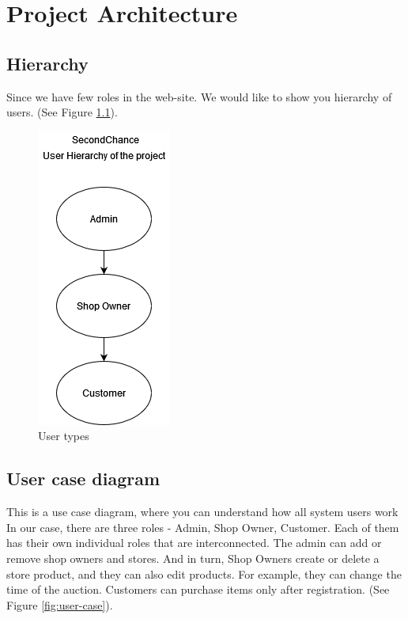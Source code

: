 \chapter{Project Architecture}\label{ch:B}

\section{Hierarchy}
Since we have few roles in the web-site. We would like to show you hierarchy of users. (See Figure \ref{fig:Hierarchy}).

\begin{figure}[h!]
    \centering
    \includegraphics[scale=0.9]{figures/Hierarchy.png}
    \caption{User types}
    \label{fig:Hierarchy}
\end{figure}

\section{User case diagram}
This is a use case diagram, where you can understand how all system users work
In our case, there are three roles - Admin, Shop Owner, Customer.  Each of them has their own individual roles that are interconnected.  The admin can add or remove shop owners and stores.  And in turn, Shop Owners create or delete a store product, and they can also edit products.  For example, they can change the time of the auction.
Customers can purchase items only after registration. (See Figure \ref{fig:user-case}).

